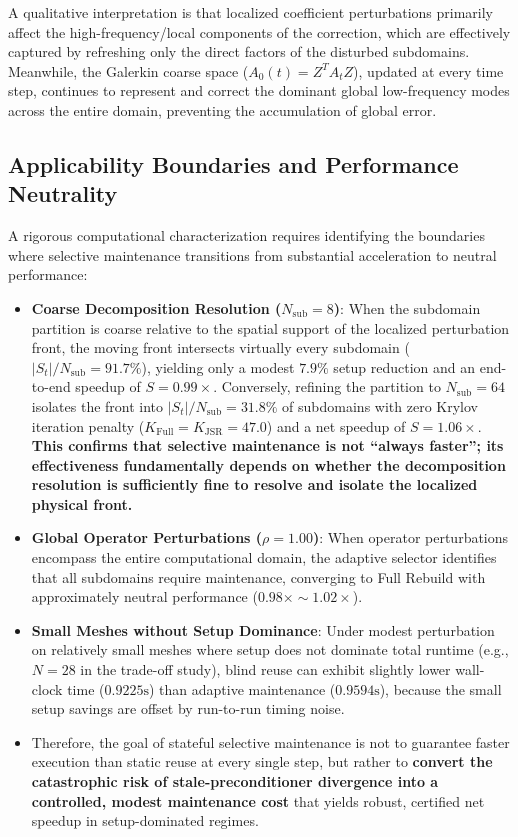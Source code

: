 \documentclass[preprint,12pt,3p]{elsarticle}
\begin{document}
A qualitative interpretation is that localized coefficient perturbations primarily affect the high-frequency/local components of the correction, which are effectively captured by refreshing only the direct factors of the disturbed subdomains. Meanwhile, the Galerkin coarse space ($A_0(t) = Z^T A_t Z$), updated at every time step, continues to represent and correct the dominant global low-frequency modes across the entire domain, preventing the accumulation of global error.

\subsection{Applicability Boundaries and Performance Neutrality}
\label{subsec:boundaries}
A rigorous computational characterization requires identifying the boundaries where selective maintenance transitions from substantial acceleration to neutral performance:
\begin{itemize}
    \item \textbf{Coarse Decomposition Resolution ($N_{\text{sub}} = 8$)}: When the subdomain partition is coarse relative to the spatial support of the localized perturbation front, the moving front intersects virtually every subdomain ($|S_t| / N_{\text{sub}} = 91.7\%$), yielding only a modest $7.9\%$ setup reduction and an end-to-end speedup of $S = 0.99\times$. Conversely, refining the partition to $N_{\text{sub}} = 64$ isolates the front into $|S_t| / N_{\text{sub}} = 31.8\%$ of subdomains with zero Krylov iteration penalty ($K_{\text{Full}} = K_{\text{JSR}} = 47.0$) and a net speedup of $S = 1.06\times$. \textbf{This confirms that selective maintenance is not ``always faster''; its effectiveness fundamentally depends on whether the decomposition resolution is sufficiently fine to resolve and isolate the localized physical front.}
    \item \textbf{Global Operator Perturbations ($\rho = 1.00$)}: When operator perturbations encompass the entire computational domain, the adaptive selector identifies that all subdomains require maintenance, converging to Full Rebuild with approximately neutral performance ($0.98\times \sim 1.02\times$).
    \item \textbf{Small Meshes without Setup Dominance}: Under modest perturbation on relatively small meshes where setup does not dominate total runtime (e.g., $N=28$ in the trade-off study), blind reuse can exhibit slightly lower wall-clock time ($0.9225\text{s}$) than adaptive maintenance ($0.9594\text{s}$), because the small setup savings are offset by run-to-run timing noise.
    \item Therefore, the goal of stateful selective maintenance is not to guarantee faster execution than static reuse at every single step, but rather to \textbf{convert the catastrophic risk of stale-preconditioner divergence into a controlled, modest maintenance cost} that yields robust, certified net speedup in setup-dominated regimes.
\end{itemize}
\end{document}
